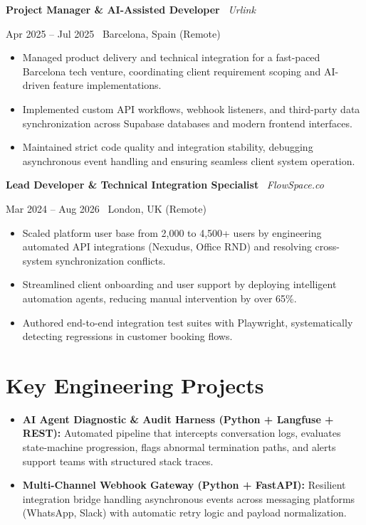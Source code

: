 \documentclass[a4paper,10pt]{article}
\newcommand{\role}[4]{%
  \vspace{2pt}\noindent
  \begin{minipage}[t]{0.70\textwidth}\raggedright\textbf{#1} \textbullet\ \textit{#3}\end{minipage}%
  \hfill
  \begin{minipage}[t]{0.28\textwidth}\raggedleft\footnotesize\color{gray}#2 \textbullet\ #4\end{minipage}%
  \vspace{1pt}%
}
\begin{document}
\vspace{3pt}
\role{Project Manager \& AI-Assisted Developer}{Apr 2025 -- Jul 2025}{Urlink}{Barcelona, Spain (Remote)}
\begin{itemize}
  \item Managed product delivery and technical integration for a fast-paced Barcelona tech venture, coordinating client requirement scoping and AI-driven feature implementations.
  \item Implemented custom API workflows, webhook listeners, and third-party data synchronization across Supabase databases and modern frontend interfaces.
  \item Maintained strict code quality and integration stability, debugging asynchronous event handling and ensuring seamless client system operation.
\end{itemize}

\vspace{3pt}
\role{Lead Developer \& Technical Integration Specialist}{Mar 2024 -- Aug 2026}{FlowSpace.co}{London, UK (Remote)}
\begin{itemize}
  \item Scaled platform user base from 2,000 to 4,500+ users by engineering automated API integrations (Nexudus, Office RND) and resolving cross-system synchronization conflicts.
  \item Streamlined client onboarding and user support by deploying intelligent automation agents, reducing manual intervention by over 65\%.
  \item Authored end-to-end integration test suites with Playwright, systematically detecting regressions in customer booking flows.
\end{itemize}

\section{Key Engineering Projects}
\begin{itemize}
  \item \textbf{AI Agent Diagnostic \& Audit Harness (Python + Langfuse + REST):} Automated pipeline that intercepts conversation logs, evaluates state-machine progression, flags abnormal termination paths, and alerts support teams with structured stack traces.
  \item \textbf{Multi-Channel Webhook Gateway (Python + FastAPI):} Resilient integration bridge handling asynchronous events across messaging platforms (WhatsApp, Slack) with automatic retry logic and payload normalization.
\end{itemize}
\end{document}
